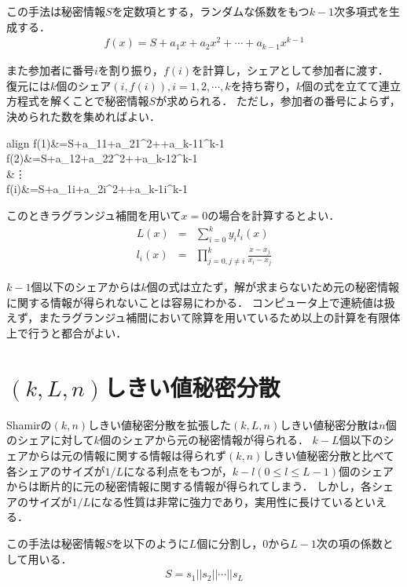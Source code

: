 \documentclass[10pt, a4paper, titlepage]{jsreport}
\begin{document}
	この手法は秘密情報$S$を定数項とする，ランダムな係数をもつ$k-1$次多項式を生成する．
	\begin{eqnarray*}
		f(x)=S+a_{1}x+a_{2}x^{2}+{\cdots}+a_{k-1}x^{k-1}
	\end{eqnarray*}

	また参加者に番号$i$を割り振り，$f(i)$を計算し，シェアとして参加者に渡す．
	復元には$k$個のシェア$(i,f(i)),i=1,2,\cdots,k$を持ち寄り，$k$個の式を立てて連立方程式を解くことで秘密情報$S$が求められる．
	ただし，参加者の番号によらず，決められた数を集めればよい．
	\begin{empheq}[left=\empheqlbrace]{align}
		f(1)&=S+a_{1}{\cdot}1+a_{2}{\cdot}1^{2}+{\cdots}+a_{k-1}{\cdot}1^{k-1} \nonumber \\
		f(2)&=S+a_{1}{\cdot}2+a_{2}{\cdot}2^{2}+{\cdots}+a_{k-1}{\cdot}2^{k-1} \nonumber \\
		&{\hspace{2.5cm}}{\vdots} \nonumber \\
		f(i)&=S+a_{1}{\cdot}i+a_{2}{\cdot}i^{2}+{\cdots}+a_{k-1}{\cdot}i^{k-1} \nonumber
	\end{empheq}

	このときラグランジュ補間を用いて$x=0$の場合を計算するとよい．
	\begin{eqnarray*}
		L(x)&=&{\sum_{i=0}^{k}{y_{i}l_{i}(x)}} \\
		l_{i}(x)&=&{\prod_{j=0,j{\neq}i}^{k}{\frac{x-x_{j}}{x_{i}-x_{j}}}}
	\end{eqnarray*}

	$k-1$個以下のシェアからは$k$個の式は立たず，解が求まらないため元の秘密情報に関する情報が得られないことは容易にわかる．
	コンピュータ上で連続値は扱えず，またラグランジュ補間において除算を用いているため以上の計算を有限体上で行うと都合がよい．

	\section{$(k,L,n)$しきい値秘密分散\cite{yamamoto}\cite{multiparty}}
	Shamirの$(k,n)$しきい値秘密分散を拡張した$(k,L,n)しきい値秘密分散$は$n$個のシェアに対して$k$個のシェアから元の秘密情報が得られる．
	$k-L$個以下のシェアからは元の情報に関する情報は得られず$(k,n)$しきい値秘密分散と比べて各シェアのサイズが$1/L$になる利点をもつが，$k-l(0{\leq}l{\leq}L-1)$個のシェアからは断片的に元の秘密情報に関する情報が得られてしまう．
	しかし，各シェアのサイズが$1/L$になる性質は非常に強力であり，実用性に長けているといえる．

	この手法は秘密情報$S$を以下のように$L$個に分割し，$0$から$L-1$次の項の係数として用いる．
	\begin{eqnarray*}
		S=s_{1}||s_{2}||{\cdots}||s_{L}
	\end{eqnarray*}
\end{document}
